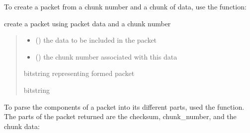 \documentclass[letterpaper,10pt,english,openany,oneside]{sphinxmanual}
\begin{document}
\sphinxAtStartPar
To create a packet from a chunk number and a chunk of data, use the  function:

\begin{fulllineitems}
\label{\detokenize{index:packet.create_packet}}
\pysigstartsignatures
\pysiglinewithargsret
{}
{\sphinxparamcomma {}}
{}
\pysigstopsignatures
\sphinxAtStartPar
create a packet using packet data and a chunk number
\begin{quote}\begin{description}
\begin{itemize}
\item {} 
\sphinxAtStartPar
{} () \textendash{} the data to be included in the packet

\item {} 
\sphinxAtStartPar
{} () \textendash{} the chunk number associated with this data

\end{itemize}

\sphinxAtStartPar
bitstring representing formed packet

\sphinxAtStartPar
bitstring

\end{description}\end{quote}

\end{fulllineitems}


\sphinxAtStartPar
To parse the components of a packet into its different parts, used the  function.
The parts of the packet returned are the checksum, chunk\_number, and the chunk data:
\end{document}

